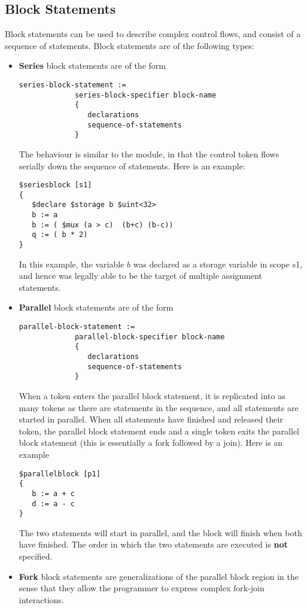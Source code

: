 \documentclass{article}
\begin{document}
\subsection{Block Statements}

Block statements can be used to describe complex
control flows, and consist of a sequence of statements.
Block statements are of
the following types:
\begin{itemize}
\item {\bf Series} block statements are of the form
\begin{verbatim}
series-block-statement :=
             series-block-specifier block-name
             { 
                declarations
                sequence-of-statements
             }
\end{verbatim}
The behaviour is similar to the module, in that the control
token flows serially down the sequence of statements.
Here is an example:
\begin{verbatim}
$seriesblock [s1] 
{
   $declare $storage b $uint<32>
   b := a
   b := ( $mux (a > c)  (b+c) (b-c))
   q := ( b * 2)
}
\end{verbatim}
In this example, the variable $b$ was declared as
a storage variable in scope s1, and hence was legally
able to be the target of multiple assignment statements.
\item {\bf Parallel} block statements are of the form
\begin{verbatim}
parallel-block-statement :=
             parallel-block-specifier block-name
             { 
                declarations
                sequence-of-statements
             }
\end{verbatim}
When a token enters the parallel block statement, it
is replicated into as many tokens as there are statements in
the sequence, and all statements are started in parallel.
When all statements have finished and released their token,
the parallel block statement
ends and a single token exits the parallel block statement (this
is essentially a fork followed by a join).
Here is an example
\begin{verbatim}
$parallelblock [p1] 
{
   b := a + c
   d := a - c
}
\end{verbatim}
The two statements will start in parallel, and the block 
will finish when both have finished.  The
order in which the two statements are executed
is {\bf not} specified.
\item {\bf Fork} block statements are generalizations of the
parallel block region in the sense that they
allow the programmer to express complex fork-join interactions.

\end{itemize}
\end{document}
